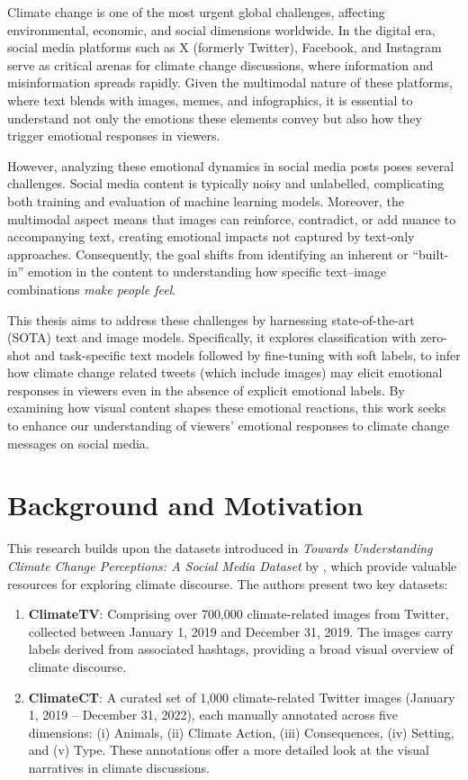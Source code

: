 Climate change is one of the most urgent global challenges, affecting environmental, economic, and social dimensions worldwide. In the digital era, social media platforms such as X (formerly Twitter), Facebook, and Instagram serve as critical arenas for climate change discussions, where information and misinformation spreads rapidly. Given the multimodal nature of these platforms, where text blends with images, memes, and infographics, it is essential to understand not only the emotions these elements convey but also how they trigger emotional responses in viewers.
\newline

However, analyzing these emotional dynamics in social media posts poses several challenges. Social media content is typically noisy and unlabelled, complicating both training and evaluation of machine learning models. Moreover, the multimodal aspect means that images can reinforce, contradict, or add nuance to accompanying text, creating emotional impacts not captured by text-only approaches. Consequently, the goal shifts from identifying an inherent or “built-in” emotion in the content to understanding how specific text–image combinations \emph{make people feel}.
\newline

This thesis aims to address these challenges by harnessing state-of-the-art (SOTA) text and image models. Specifically, it explores classification with zero-shot and task-specific text models followed by fine-tuning with soft labels, to infer how climate change related tweets (which include images) may elicit emotional responses in viewers even in the absence of explicit emotional labels. By examining how visual content shapes these emotional reactions, this work seeks to enhance our understanding of viewers’ emotional responses to climate change messages on social media.

\section{Background and Motivation}

This research builds upon the datasets introduced in \textit{Towards Understanding Climate Change Perceptions: A Social Media Dataset} by \citet{prasse2023towards}, which provide valuable resources for exploring climate discourse. The authors present two key datasets:

\begin{enumerate}
    \item \textbf{ClimateTV}: Comprising over 700,000 climate-related images from Twitter, collected between January 1, 2019 and December 31, 2019. The images carry labels derived from associated hashtags, providing a broad visual overview of climate discourse.
    \item \textbf{ClimateCT}: A curated set of 1,000 climate-related Twitter images (January 1, 2019 – December 31, 2022), each manually annotated across five dimensions: (i) Animals, (ii) Climate Action, (iii) Consequences, (iv) Setting, and (v) Type. These annotations offer a more detailed look at the visual narratives in climate discussions.
\end{enumerate}

